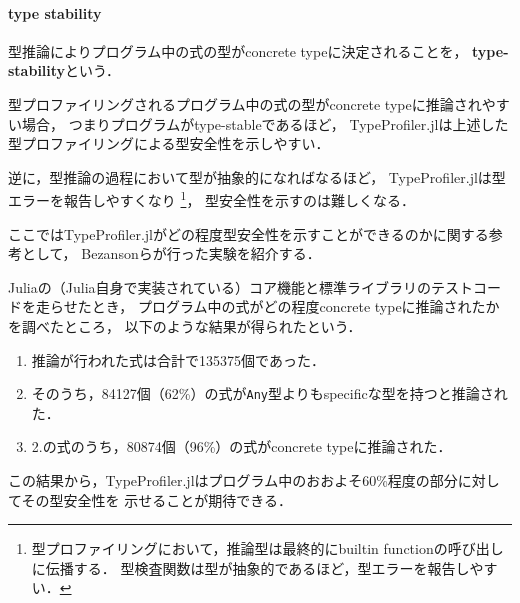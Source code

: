 \paragraph*{type stability}

型推論によりプログラム中の式の型がconcrete typeに決定されることを，
\textbf{type-stability}\cite{type-stability}という．

型プロファイリングされるプログラム中の式の型がconcrete typeに推論されやすい場合，
つまりプログラムがtype-stableであるほど，
TypeProfiler.jlは上述した型プロファイリングによる型安全性を示しやすい．

逆に，型推論の過程において型が抽象的になればなるほど，
TypeProfiler.jlは型エラーを報告しやすくなり
\footnote{
  型プロファイリングにおいて，推論型は最終的にbuiltin functionの呼び出しに伝播する．
  型検査関数は型が抽象的であるほど，型エラーを報告しやすい．
}，
型安全性を示すのは難しくなる．

ここではTypeProfiler.jlがどの程度型安全性を示すことができるのかに関する参考として，
Bezansonらが行った実験\cite{julia-2012}を紹介する．

Juliaの（Julia自身で実装されている）コア機能と標準ライブラリのテストコードを走らせたとき，
プログラム中の式がどの程度concrete typeに推論されたかを調べたところ，
以下のような結果が得られたという\footnotemark．

\begin{enumerate}
  \item 推論が行われた式は合計で135375個であった．
  \item そのうち，84127個（62\%）の式が\texttt{Any}型よりもspecificな型を持つと推論された．
  \item 2.の式のうち，80874個（96\%）の式がconcrete typeに推論された．
\end{enumerate}

この結果から，TypeProfiler.jlはプログラム中のおおよそ60\%程度の部分に対してその型安全性を
示せることが期待できる．

